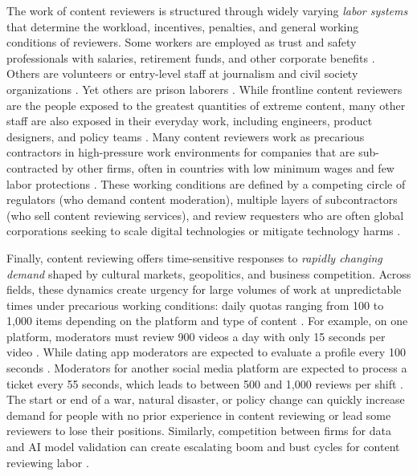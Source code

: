 The work of content reviewers is structured through widely varying \textit{labor systems} that determine the workload, incentives, penalties, and general working conditions of reviewers. Some workers are employed as trust and safety professionals with salaries, retirement funds, and other corporate benefits \cite{roberts_behind_2019}. Others are volunteers or entry-level staff at journalism and civil society organizations \cite{dubberley_making_2015}. Yet others are prison laborers \cite{lehtiniemi_prisoners_2022, kaun_prison_2020}. While frontline content reviewers are the people exposed to the greatest quantities of extreme content, many other staff are also exposed in their everyday work, including engineers, product designers, and policy teams \cite{tspa2024content}. Many content reviewers work as precarious contractors in high-pressure work environments for companies that are sub-contracted by other firms, often in countries with low minimum wages and few labor protections \cite{buni2016secret, roberts2017social, chen2014laborers}. These working conditions are defined by a competing circle of regulators (who demand content moderation), multiple layers of subcontractors (who sell content reviewing services), and review requesters who are often global corporations seeking to scale digital technologies or mitigate technology harms \cite{gillespie2019custodians}.

Finally, content reviewing offers time-sensitive responses to \textit{rapidly changing demand} shaped by cultural markets, geopolitics, and business competition. Across fields, these dynamics create urgency for large volumes of work at unpredictable times under precarious working conditions: daily quotas ranging from 100 to 1,000 items depending on the platform and type of content \cite{bbc2022moderators,mcintyre_behind_2022,bureau2023dating}. For example, on one platform, moderators must review 900 videos a day with only 15 seconds per video \cite{mcintyre_behind_2022}. While dating app moderators are expected to evaluate a profile every 100 seconds \cite{bureau2023dating}. Moderators for another social media platform are expected to process a ticket every 55 seconds, which leads to between 500 and 1,000 reviews per shift \cite{guardian2024african}. The start or end of a war, natural disaster, or policy change can quickly increase demand for people with no prior experience in content reviewing or lead some reviewers to lose their positions. Similarly, competition between firms for data and AI model validation can create escalating boom and bust cycles for content reviewing labor \cite{ganguli_red_2022}.


